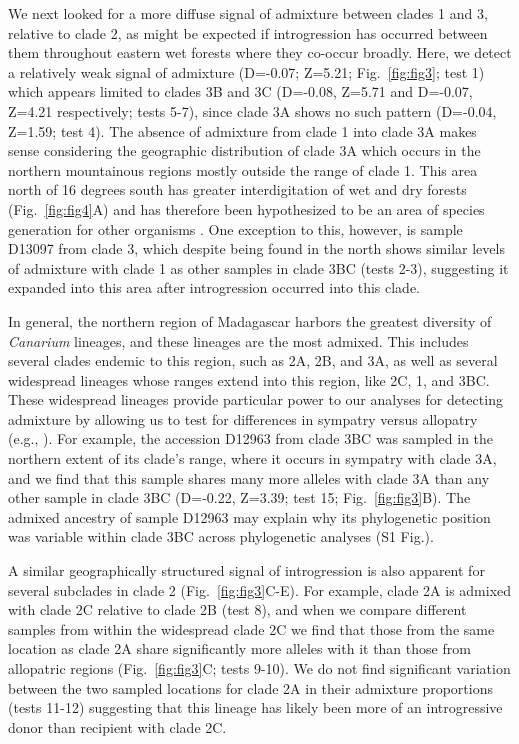 \documentclass[10pt,letterpaper]{article}
\begin{document}
We next looked for a more diffuse signal of admixture between clades 1 and 3, relative to clade 2, as might be expected if introgression has occurred between them throughout eastern wet forests where they co-occur broadly. Here, we detect a relatively weak signal of admixture (D=-0.07; Z=5.21; Fig.~\ref{fig:fig3}; test 1) which appears limited to clades 3B and 3C (D=-0.08, Z=5.71 and D=-0.07, Z=4.21 respectively; tests 5-7), since clade 3A shows no such pattern (D=-0.04, Z=1.59; test 4). The absence of admixture from clade 1 into clade 3A makes sense considering the geographic distribution of clade 3A which occurs in the northern mountainous regions mostly outside the range of clade 1. This area north of 16 degrees south has greater interdigitation of wet and dry forests (Fig.~\ref{fig:fig4}A) and has therefore been hypothesized to be an area of species generation for other organisms \cite{vences_madagascar_2009}. One exception to this, however, is sample D13097 from clade 3, which despite being found in the north shows similar levels of admixture with clade 1 as other samples in clade 3BC (tests 2-3), suggesting it expanded into this area after introgression occurred into this clade. 

In general, the northern region of Madagascar harbors the greatest diversity of \emph{Canarium} lineages, and these lineages are the most admixed. This includes several clades endemic to this region, such as 2A, 2B, and 3A, as well as several widespread lineages whose ranges extend into this region, like 2C, 1, and 3BC. These widespread lineages provide particular power to our analyses for detecting admixture by allowing us to test for differences in sympatry versus allopatry (e.g., \cite{eaton_historical_2015}). For example, the accession D12963 from clade 3BC was sampled in the northern extent of its clade's range, where it occurs in sympatry with clade 3A, and we find that this sample shares many more alleles with clade 3A than any other sample in clade 3BC (D=-0.22, Z=3.39; test 15; Fig.~\ref{fig:fig3}B). The admixed ancestry of sample D12963 may explain why its phylogenetic position was variable within clade 3BC across phylogenetic analyses (S1 Fig.).%

A similar geographically structured signal of introgression is also apparent for several subclades in clade 2 (Fig.~\ref{fig:fig3}C-E). For example, clade 2A is admixed with clade 2C relative to clade 2B (test 8), and when we compare different samples from within the widespread clade 2C we find that those from the same location as clade 2A share significantly more alleles with it than those from allopatric regions (Fig.~\ref{fig:fig3}C; tests 9-10). We do not find significant variation between the two sampled locations for clade 2A in their admixture proportions (tests 11-12) suggesting that this lineage has likely been more of an introgressive donor than recipient with clade 2C.
\end{document}
